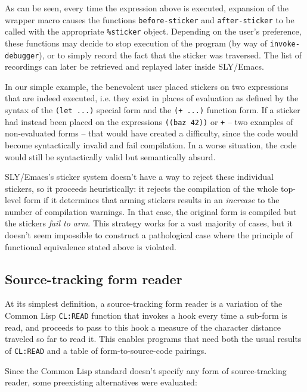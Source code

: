 \documentclass[format=sigconf]{acmart}
\begin{document}
As can be seen, every time the expression above is executed, expansion
of the wrapper macro causes the functions \texttt{before-sticker} and
\texttt{after-sticker} to be called with the appropriate
\texttt{\%sticker} object.  Depending on the user's preference, these
functions may decide to stop execution of the program (by way of
\texttt{invoke-debugger}), or to simply record the fact that the
sticker was traversed.  The list of recordings can later be retrieved
and replayed later inside SLY/Emacs.

In our simple example, the benevolent user placed stickers on two
expressions that are indeed executed, i.e. they exist in places of
evaluation as defined by the syntax of the \texttt{(let ...)}  special
form and the \texttt{(+ ...)} function form.  If a sticker had instead
been placed on the expressions \texttt{((baz 42))} or \texttt{+} --
two examples of non-evaluated forms -- that would have created a
difficulty, since the code would become syntactically invalid and fail
compilation.  In a worse situation, the code would still be
syntactically valid but semantically absurd.

SLY/Emacs's sticker system doesn't have a way to reject these
individual stickers, so it proceeds heuristically: it rejects the
compilation of the whole top-level form if it determines that arming
stickers results in an \emph{increase} to the number of compilation
warnings.  In that case, the original form is compiled but the
stickers \emph{fail to arm}.  This strategy works for a vast majority
of cases, but it doesn't seem impossible to construct a pathological
case where the principle of functional equivalence stated above is
violated.

\subsection{Source-tracking form reader}\label{st-reader}

At its simplest definition, a source-tracking form reader is a
variation of the Common Lisp \texttt{CL:READ} function that invokes a
hook every time a sub-form is read, and proceeds to pass to this hook
a measure of the character distance traveled so far to read it.  This
enables programs that need both the usual results of \texttt{CL:READ}
and a table of form-to-source-code pairings.

Since the Common Lisp standard doesn't specify any form of
source-tracking reader, some preexisting alternatives were evaluated:
\end{document}
